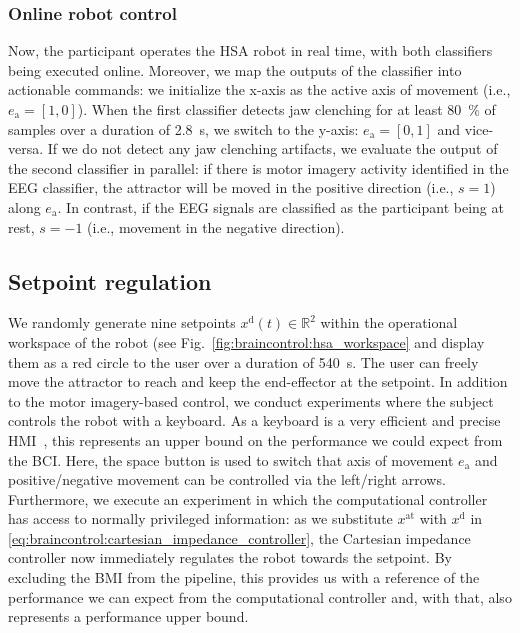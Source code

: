 \subsubsection{Online robot control}
Now, the participant operates the HSA robot in real time, with both classifiers being executed online.
Moreover, we map the outputs of the classifier into actionable commands: we initialize the x-axis as the active axis of movement (i.e., $e_\mathrm{a} = [1,0]$). When the first classifier detects jaw clenching for at least \SI{80}{\percent} of samples over a duration of \SI{2.8}{s}, we switch to the y-axis: $e_\mathrm{a} = [0,1]$ and vice-versa. If we do not detect any jaw clenching artifacts, we evaluate the output of the second classifier in parallel: if there is motor imagery activity identified in the \gls{EEG} classifier, the attractor will be moved in the positive direction (i.e., $s=1$) along $e_\mathrm{a}$. In contrast, if the \gls{EEG} signals are classified as the participant being at rest, $s=-1$ (i.e., movement in the negative direction).


\subsection{Setpoint regulation}\label{sub:braincontrol:experiments:setpoint_regulation}
We randomly generate nine setpoints $x^\mathrm{d}(t) \in \mathbb{R}^2$ within the operational workspace of the robot (see Fig.~\ref{fig:braincontrol:hsa_workspace} and display them as a red circle to the user over a duration of \SI{540}{s}.
The user can freely move the attractor to reach and keep the end-effector at the setpoint.
In addition to the motor imagery-based control, we conduct experiments where the subject controls the robot with a keyboard.
As a keyboard is a very efficient and precise \gls{HMI}~\cite{vasiljevic2016case, mahmud2020interface}, this represents an upper bound on the performance we could expect from the \gls{BCI}.
Here, the space button is used to switch that axis of movement $e_\mathrm{a}$ and positive/negative movement can be controlled via the left/right arrows.
Furthermore, we execute an experiment in which the computational controller has access to normally privileged information: as we substitute $x^\mathrm{at}$ with $x^\mathrm{d}$ in \eqref{eq:braincontrol:cartesian_impedance_controller}, the Cartesian impedance controller now immediately regulates the robot towards the setpoint.
By excluding the \gls{BMI} from the pipeline, this provides us with a reference of the performance we can expect from the computational controller and, with that, also represents a performance upper bound.

